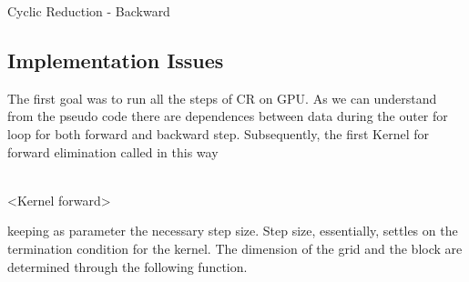 \begin{algorithm}[H]
\begin{algorithmic}[1]
        	\State{\hspace*{2cm}\}}
        	\State{\}} 
\EndFunction
\end{algorithmic}
\caption{Cyclic Reduction - Backward}
\label{alg:Backward_cr}
\end{algorithm}


\subsection{Implementation Issues}


The first goal was to run all the steps of CR on GPU. As we can understand from the pseudo code there are dependences between data during the outer for loop for both forward and backward step. 
Subsequently, the first Kernel for forward elimination called in this way
\begin{algorithmic}
\\
 \hspace*{1cm}<Kernel forward>
\EndFor
\end{algorithmic}


keeping as parameter the necessary step size. Step size, essentially, settles on the termination condition for the kernel. The dimension of the grid and the block are determined through the following function.

